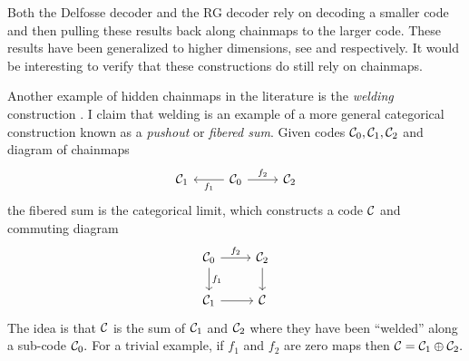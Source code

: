 \documentclass[12pt]{article}
\begin{document}
Both the Delfosse decoder %
and the RG decoder rely on decoding a smaller code
and then pulling these results back along
chainmaps to the larger code.
These results have been generalized to
higher dimensions, see \cite{aloshious2016} and
\cite{duivenvoorden2017} respectively.
It would be interesting to verify that these
constructions do still rely on chainmaps.

Another example of hidden chainmaps
in the literature is the \emph{welding}
construction \cite{michnicki2014}.
I claim that welding is an example of
a more general categorical construction
known as a \emph{pushout} or
\emph{fibered sum}.
Given codes $\mathcal{C}_0, \mathcal{C}_1, \mathcal{C}_2$
and diagram of chainmaps
$$
\begin{tikzcd}
    \Code_1  & \Code_0 \arrow{l}{f_1} \arrow{r}{f_2} & \Code_2
\end{tikzcd}
$$
the fibered sum is the categorical limit, which
constructs a code $\mathcal{C}$ and commuting diagram
$$
\begin{tikzcd}
    \Code_0 \arrow{d}{f_1} \arrow{r}{f_2} & \Code_2 \arrow{d} \\
    \Code_1 \arrow{r} & \Code 
\end{tikzcd}
$$
The idea is that $\mathcal{C}$ is the sum of
$\mathcal{C}_1$ and $\mathcal{C}_2$ where they have been
``welded'' along a sub-code $\mathcal{C}_0.$
For a trivial example, if $f_1$ and $f_2$ are zero maps
then $\mathcal{C} = \mathcal{C}_1\oplus\mathcal{C}_2.$



%
%
%
\end{document}
